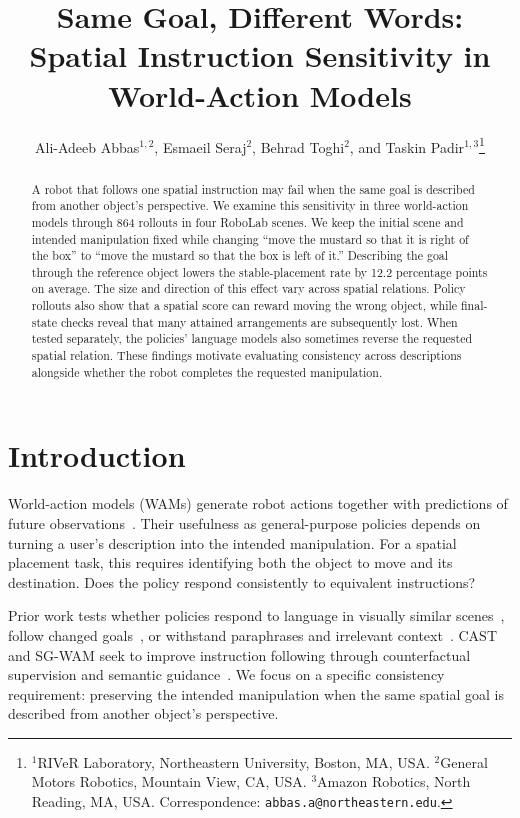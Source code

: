 \documentclass{article}
\title{Same Goal, Different Words:\\Spatial Instruction Sensitivity in World-Action Models}
\author{Ali-Adeeb Abbas$^{1,2}$, Esmaeil Seraj$^2$, Behrad Toghi$^2$, and Taskin Padir$^{1,3}$\thanks{$^1$RIVeR Laboratory, Northeastern University, Boston, MA, USA. $^2$General Motors Robotics, Mountain View, CA, USA. $^3$Amazon Robotics, North Reading, MA, USA. Correspondence: \texttt{abbas.a@northeastern.edu}.}}
\begin{document}
\maketitle
\begin{abstract}
A robot that follows one spatial instruction may fail when the same goal is described from another object's perspective. We examine this sensitivity in three world-action models through 864 rollouts in four RoboLab scenes. We keep the initial scene and intended manipulation fixed while changing ``move the mustard so that it is right of the box'' to ``move the mustard so that the box is left of it.'' Describing the goal through the reference object lowers the stable-placement rate by 12.2 percentage points on average. The size and direction of this effect vary across spatial relations. Policy rollouts also show that a spatial score can reward moving the wrong object, while final-state checks reveal that many attained arrangements are subsequently lost. When tested separately, the policies' language models also sometimes reverse the requested spatial relation. These findings motivate evaluating consistency across descriptions alongside whether the robot completes the requested manipulation.

\end{abstract}

\setlength{\parskip}{2.5pt}
\setlength{\intextsep}{8pt plus 2pt minus 2pt}
\setlength{\textfloatsep}{12pt plus 2pt minus 2pt}
\section{Introduction}
World-action models (WAMs) generate robot actions together with predictions of future observations~\citep{kim2026cosmospolicy}. Their usefulness as general-purpose policies depends on turning a user's description into the intended manipulation. For a spatial placement task, this requires identifying both the object to move and its destination. Does the policy respond consistently to equivalent instructions?

Prior work tests whether policies respond to language in visually similar scenes~\citep{tri2025lbm}, follow changed goals~\citep{fang2026counterfactual}, or withstand paraphrases and irrelevant context~\citep{fei2026liberoplus,kim2026liberopara,moskalenko2026bring}. CAST and SG-WAM seek to improve instruction following through counterfactual supervision and semantic guidance~\citep{glossop2025cast,he2026sgwam}. We focus on a specific consistency requirement: preserving the intended manipulation when the same spatial goal is described from another object's perspective.
\end{document}
